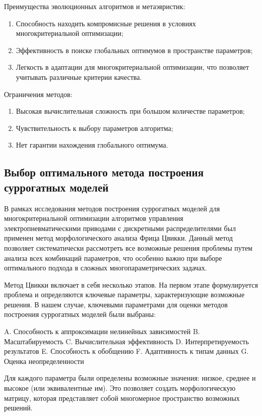 Преимущества эволюционных алгоритмов и метаэвристик:

\begin{enumerate}
    \item Способность находить компромисные решения в условиях многокритериальной оптимизации;
    \item Эффективность в поиске глобальных оптимумов в пространстве параметров;
    \item Легкость в адаптации для многокритериальной оптимизации, что позволяет учитывать
          различные критерии качества.
\end{enumerate}

Ограничения методов:
\begin{enumerate}
    \item Высокая вычислительная сложность при большом количестве параметров;
    \item Чувствительность к выбору параметров алгоритма;
    \item Нет гарантии нахождения глобального оптимума.
\end{enumerate}

\subsection{Выбор оптимального метода построения суррогатных моделей}\label{sec:ch4/sec3/subsec2}

В рамках исследования методов построения суррогатных моделей
для многокритериальной оптимизации алгоритмов управления
электропневматическими приводами с дискретными распределителями
был применен метод морфологического анализа Фрица Цвикки. Данный
метод позволяет систематически рассмотреть все возможные решения
проблемы путем анализа всех комбинаций параметров, что особенно важно
при выборе оптимального подхода в сложных многопараметрических задачах.

Метод Цвикки включает в себя несколько этапов. На первом этапе
формулируется проблема и определяются ключевые параметры,
характеризующие возможные решения. В нашем случае, ключевыми
параметрами для оценки методов построения суррогатных моделей были выбраны:

A. Способность к аппроксимации нелинейных зависимостей
B. Масштабируемость
C. Вычислительная эффективность
D. Интерпретируемость результатов
E. Способность к обобщению
F. Адаптивность к типам данных
G. Оценка неопределенности

Для каждого параметра были определены возможные значения:
низкое, среднее и высокое (или эквивалентные им).
Это позволяет создать морфологическую матрицу,
которая представляет собой многомерное пространство возможных решений.

